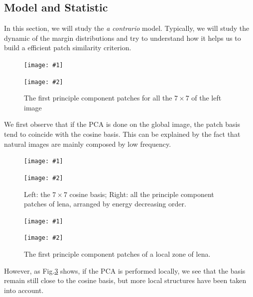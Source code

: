 \documentclass[runningheads]{llncs}
\newcommand{\insertTwoF}[5]{
  \begin{figure}[h!]
    \centering
    \begin{minipage}{#4\linewidth}
    \texttt{[image: \#1]}
    \end{minipage}
    \begin{minipage}{#4\linewidth}
    \texttt{[image: \#2]}
    \end{minipage}
      \caption{#3}
      \label{#5}
  \end{figure}  
}
\begin{document}
\subsection{Model and Statistic}

In this section, we will study the \textit{a contrario} model. Typically, we will study the dynamic of the margin distributions and try to understand how it helps us to build a efficient patch similarity criterion.
\insertTwoF{lena}{patches}{The first principle component patches for all the $7\times 7$ of the left image}{0.45}{lena_patches}

We first observe that if the PCA is done on the global image, the patch basis tend to coincide with the cosine basis. This can be explained by the fact that natural images are mainly composed by low frequency.
\insertTwoF{cosine_basis}{princomp_lena}{Left: the $7\times 7$ cosine basis; Right: all the principle component patches of lena, arranged by energy decreasing order.}{0.45}{cosb}
\insertTwoF{lena_local}{patches_local}{The first principle component patches of a local zone of lena. }{0.45}{local}

However, as Fig.\ref{local} shows, if the PCA is performed locally, we see that the basis remain still close to the cosine basis, but more local structures have been taken into account.
\end{document}
